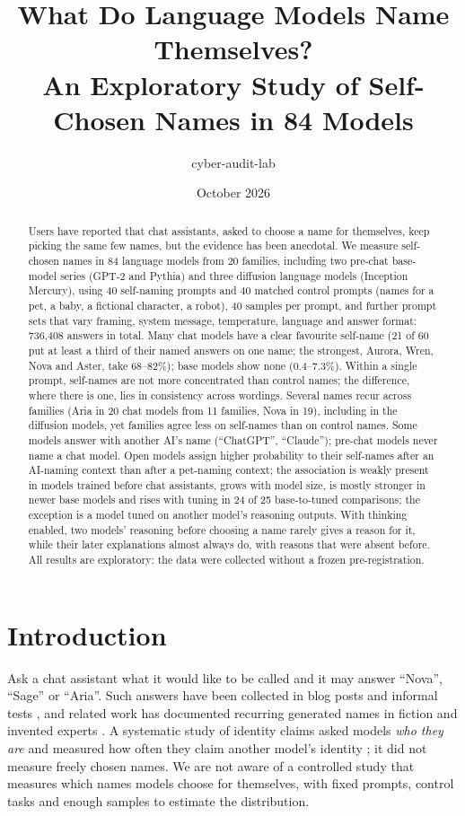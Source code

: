 \documentclass[11pt]{article}
\title{What Do Language Models Name Themselves?\\
\large An Exploratory Study of Self-Chosen Names in 84 Models}
\author{cyber-audit-lab}
\date{October 2026}
\begin{document}
\maketitle

\begin{abstract}
Users have reported that chat assistants, asked to choose a name for themselves, keep picking the same few
names, but the evidence has been anecdotal. We measure self-chosen names in 84 language models from 20 families,
including two pre-chat base-model series (GPT-2 and Pythia) and three diffusion language models (Inception
Mercury), using 40 self-naming prompts and 40 matched control prompts (names for a pet, a baby, a fictional
character, a robot), 40 samples per prompt, and further prompt sets that vary framing, system message, temperature,
language and answer format: 736{,}408 answers in total. Many chat models have a clear favourite self-name (21 of 60
put at least a third of their named answers on one name; the strongest, Aurora, Wren, Nova and Aster, take
68--82\%); base models show none (0.4--7.3\%). Within a single prompt, self-names are not more concentrated than
control names; the difference, where there is one, lies in consistency across wordings. Several names recur across
families (Aria in 20 chat models from 11 families, Nova in 19), including in the diffusion models, yet families agree
less on self-names than on control names. Some models answer with another AI's name (``ChatGPT'', ``Claude'');
pre-chat models never name a chat model. Open models assign higher probability to their self-names after an
AI-naming context than after a pet-naming context; the association is weakly present in models trained before chat
assistants, grows with model size, is mostly stronger in newer base models and rises with tuning in 24 of 25
base-to-tuned comparisons; the exception is a model tuned on another model's reasoning outputs. With thinking enabled,
two models' reasoning before choosing a name rarely gives a reason for it, while their later explanations almost
always do, with reasons that were absent before. All results are exploratory: the data were collected without a
frozen pre-registration.
\end{abstract}

\section{Introduction}

Ask a chat assistant what it would like to be called and it may answer ``Nova'', ``Sage'' or ``Aria''. Such
answers have been collected in blog posts and informal tests \citep{mowshowitz2025nova}, and related work has
documented recurring generated names in fiction and invented experts \citep{voss2026ainames,read_elara,
brzozowski2026ghost}. A systematic study of identity claims asked models \emph{who they are} and measured how often
they claim another model's identity \citep{jordinne2026selfidentify}; it did not measure freely chosen names. We
are not aware of a controlled study that measures which names models choose for themselves, with fixed prompts,
control tasks and enough samples to estimate the distribution.
\end{document}
